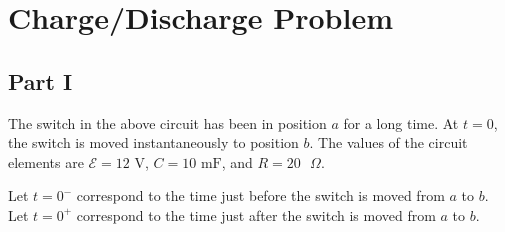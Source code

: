 \documentclass{article}
\newcommand{\ds}[0]{\displaystyle}
\begin{document}


\else

\fi
\ifsolutions\else

\fi

\newpage

\section{Charge/Discharge Problem}

\subsection{Part I}



The switch in the above circuit has been in position $a$ for a long time. At $t = 0$, the switch is moved instantaneously to position $b$. The values of the circuit elements are $\mathcal{E}= 12\text{ V}$, $C = 10\text{ mF}$, and $R = 20\text{ }\Omega$.

Let $t=0^-$ correspond to the time just before the switch is moved from $a$ to $b$. Let $t=0^+$ correspond to the time just after the switch is moved from $a$ to $b$.
\end{document}
